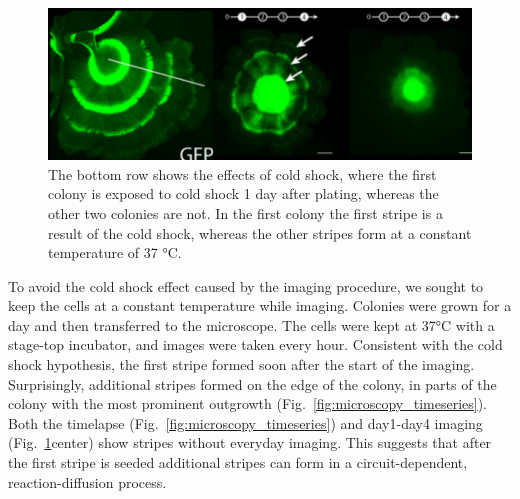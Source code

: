 \begin{figure}[H] %
    \centering
    \begin{adjustbox}{center}
        \includegraphics[width=1.1\textwidth]{chapters/Chapter 3/cold_shock_experiments} %
    \end{adjustbox}
    \caption{The bottom row shows the effects of cold shock, where the first colony is exposed to cold shock 1 day after plating, whereas the other two colonies are not. In the first colony the first stripe is a result of the cold shock, whereas the other stripes form at a constant temperature of 37 °C. }
    \label{fig:cold_shock_experiments}
\end{figure}

To avoid the cold shock effect caused by the imaging procedure, we sought to keep the cells at a constant temperature while imaging.
Colonies were grown for a day and then transferred to the microscope.
The cells were kept at 37°C with a stage-top incubator, and images were taken every hour.
Consistent with the cold shock hypothesis, the first stripe formed soon after the start of the imaging.
Surprisingly, additional stripes formed on the edge of the colony, in parts of the colony with the most prominent outgrowth (Fig.~\ref{fig:microscopy_timeseries}).
Both the timelapse (Fig.~\ref{fig:microscopy_timeseries}) and day1-day4 imaging (Fig.~\ref{fig:cold_shock_experiments}center) show stripes without everyday imaging.
This suggests that after the first stripe is seeded additional stripes can form in a circuit-dependent, reaction-diffusion process.


